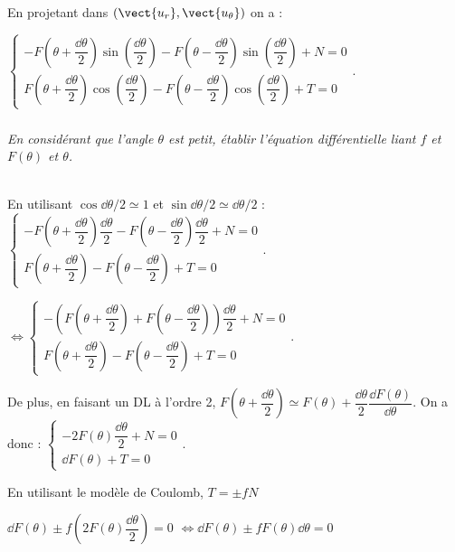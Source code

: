 \begin{multicols}{2}
\begin{multicols}{2}
\begin{corrige}
En projetant dans $\left( \vect{u_r}, \vect{u_{\theta}}\right)$ on a :
 
$\left\{ 
\begin{array}{l}
-F\left(\theta+\dfrac{\dd \theta}{2}\right)  \sin\left(\dfrac{\dd \theta}{2}\right)  -F\left(\theta-\dfrac{\dd \theta}{2}\right) \sin\left(\dfrac{\dd \theta}{2}\right) + N= 0 \\
F\left(\theta+\dfrac{\dd \theta}{2}\right) \cos\left(\dfrac{\dd \theta}{2}\right) -F\left(\theta-\dfrac{\dd \theta}{2}\right) \cos\left(\dfrac{\dd \theta}{2}\right) + T = 0
\end{array}
\right.$.

\end{corrige}
\else
\fi


\subparagraph{}\textit{En considérant que l'angle $\theta$ est petit, établir l'équation différentielle liant $f$ et $F(\theta)$ et $\theta$.}
\ifprof
\begin{corrige} ~\\
En utilisant $\cos \dd \theta/2 \simeq 1$ et $\sin \dd \theta/2 \simeq \dd \theta/2$ :
$\left\{ 
\begin{array}{l}
-F\left(\theta+\dfrac{\dd \theta}{2}\right)\dfrac{\dd \theta}{2} -F\left(\theta-\dfrac{\dd \theta}{2}\right) \dfrac{\dd \theta}{2} + N= 0 \\
F\left(\theta+\dfrac{\dd \theta}{2}\right) -F\left(\theta-\dfrac{\dd \theta}{2}\right) + T = 0
\end{array}
\right.$.


$
\Leftrightarrow \left\{ 
\begin{array}{l}
-\left(F\left(\theta+\dfrac{\dd \theta}{2}\right) +F\left(\theta-\dfrac{\dd \theta}{2}\right)\right) \dfrac{\dd \theta}{2} + N= 0 \\
F\left(\theta+\dfrac{\dd \theta}{2}\right) -F\left(\theta-\dfrac{\dd \theta}{2}\right) + T = 0
\end{array}
\right.$.

De plus, en faisant un DL à l'ordre 2, $F\left(\theta+\dfrac{\dd \theta}{2}\right)\simeq  F(\theta)+\dfrac{\dd \theta}{2} \dfrac{\dd F(\theta)}{\dd \theta}$.
On a donc : 
$
\left\{ 
\begin{array}{l}
-2 F\left(\theta\right) \dfrac{\dd \theta}{2} + N= 0 \\
 \dd F(\theta)+ T = 0
\end{array}
\right.$.

En utilisant le modèle de Coulomb, $T=\pm fN$

 $ \dd F(\theta)\pm f \left( 2 F\left(\theta\right) \dfrac{\dd \theta}{2}\right) = 0$
 $  \Leftrightarrow \dd F(\theta)\pm f  F\left(\theta\right) \dd \theta = 0$


\end{corrige}
\end{multicols}
\end{multicols}
